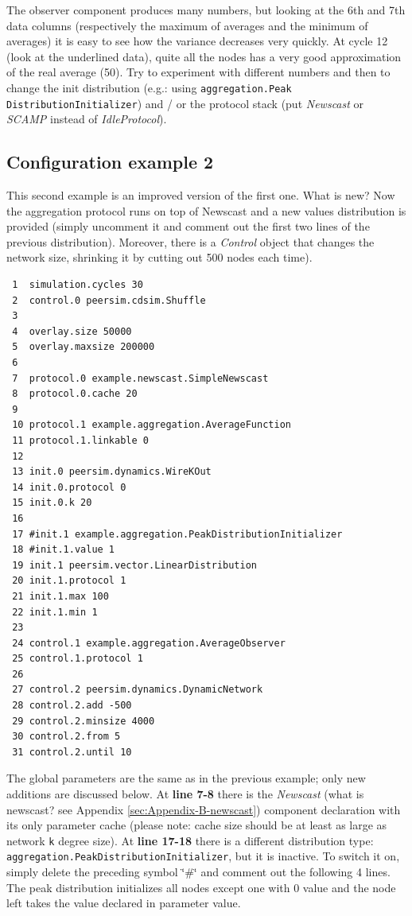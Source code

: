 \documentclass[a4paper,11pt]{article}
\begin{document}
\normalsize

The observer component produces many numbers, but looking at the 6th and
7th data columns (respectively the maximum of averages and the minimum
of averages) it is easy to see how the variance decreases very quickly.
At cycle 12 (look at the underlined data), quite all the nodes has
a very good approximation of the real average (50). Try to experiment
with different numbers and then to change the init distribution (e.g.:
using \texttt{aggregation.Peak DistributionInitializer}) and / or the
protocol stack (put \emph{Newscast} or \emph{SCAMP} instead of 
\emph{IdleProtocol}).


\subsection{Configuration example 2}

This second example is an improved version of the first one. What is
new? Now the aggregation protocol runs on top of Newscast and a new
values distribution is provided (simply uncomment it and comment out
the first two lines of the previous distribution). Moreover, there is
a \emph{Control} object that changes the network size, shrinking it by
cutting out 500 nodes each time).

\footnotesize
\begin{verbatim}
 1  simulation.cycles 30
 2  control.0 peersim.cdsim.Shuffle
 3
 4  overlay.size 50000
 5  overlay.maxsize 200000
 6
 7  protocol.0 example.newscast.SimpleNewscast
 8  protocol.0.cache 20
 9
 10 protocol.1 example.aggregation.AverageFunction
 11 protocol.1.linkable 0
 12
 13 init.0 peersim.dynamics.WireKOut
 14 init.0.protocol 0
 15 init.0.k 20
 16 
 17 #init.1 example.aggregation.PeakDistributionInitializer
 18 #init.1.value 1
 19 init.1 peersim.vector.LinearDistribution
 20 init.1.protocol 1
 21 init.1.max 100
 22 init.1.min 1
 23
 24 control.1 example.aggregation.AverageObserver
 25 control.1.protocol 1
 26
 27 control.2 peersim.dynamics.DynamicNetwork
 28 control.2.add -500
 29 control.2.minsize 4000
 30 control.2.from 5
 31 control.2.until 10
\end{verbatim}
\normalsize

The global parameters are the same as in the previous example; only
new additions are discussed below. At \textbf{line 7-8} there is the
\emph{Newscast} (what is newscast? see Appendix \ref{sec:Appendix-B-newscast}) 
component declaration with its 
only parameter cache (please note: cache size should be at least as
large as network \texttt{k} degree size). At \textbf{line 17-18} there is a different
distribution type: \texttt{aggregation.PeakDistributionInitializer},
but it is inactive. To switch it on, simply delete the preceding symbol
\char`\"{}\#\char`\"{} and comment out the following 4 lines. The
peak distribution initializes all nodes except one with 0 value and
the node left takes the value declared in parameter value.
\end{document}
